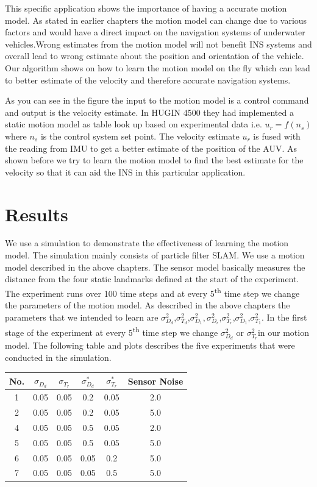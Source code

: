 \documentclass[12pt]{dalcsthesis}
\begin{document}
{This specific application shows the importance of having a accurate motion model. As stated in earlier chapters the motion model can change due to various factors and would have a direct impact on the navigation systems of underwater vehicles.Wrong estimates from the motion model will not benefit INS systems and overall lead to wrong estimate about the position and orientation of the vehicle. Our algorithm shows on how to learn the motion model on the fly which can lead to better estimate of the velocity and therefore accurate navigation systems.

As you can see in the figure the input to the motion model is a control command and output is the velocity estimate. In HUGIN 4500 they had implemented a static motion model as table look up based on experimental data i.e.
$u_{r}=f(n_{s})$  where $n_{s}$ is the control system set point. The velocity estimate $u_{r}$ is fused with the reading from IMU to get a better estimate of the position of the AUV. As shown before we try to learn the motion model to find the best estimate for the velocity so that it can aid the INS in this particular application. 

\section{Results}
We use a simulation to demonstrate the effectiveness of learning the
motion model. The simulation mainly consists of particle filter SLAM.
We use a motion model described in the above chapters. The sensor
model basically measures the distance from the four static landmarks
defined at the start of the experiment. The experiment runs over 100
time steps and at every 5\textsuperscript{th} time step we change
the parameters of the motion model. As described in the above chapters
the parameters that we intended to learn are $\sigma_{D_{d}}^{2}$,$\sigma_{T_{d}}^{2}$,$\sigma_{D_{1}}^{2},\sigma_{D_{r}}^{2}$,$\sigma_{T_{r}}^{2}$,$\sigma_{D_{1}}^{2}$,$\sigma_{T_{1}}^{2}$.
In the first stage of the experiment at every 5\textsuperscript{th }time step
we change $\sigma_{D_{d}}^{2}$ or $\sigma_{T_{r}}^{2}$in our motion
model. The following table and plots describes the five experiments
that were conducted in the simulation.

\begin{tabular}{|c|c|c|c|c|c|}
\hline 
No. & $\sigma_{D_{d}}$ & $\sigma_{T_{r}}$ & $\sigma_{D_{d}}^{*}$ & $\sigma_{T_{r}}^{*}$ & Sensor Noise\tabularnewline
\hline 
\hline 
1 & 0.05 & 0.05 & 0.2 & 0.05 & 2.0\tabularnewline
\hline 
2 & 0.05 & 0.05 & 0.2 & 0.05 & 5.0\tabularnewline
\hline 
4 & 0.05 & 0.05 & 0.5 & 0.05 & 2.0\tabularnewline
\hline 
5 & 0.05 & 0.05 & 0.5 & 0.05 & 5.0\tabularnewline
\hline 
6 & 0.05 & 0.05 & 0.05 & 0.2 & 5.0\tabularnewline
\hline 
7 & 0.05 & 0.05 & 0.05 & 0.5 & 5.0\tabularnewline
\hline 
\end{tabular}
\\

}
\end{document}
